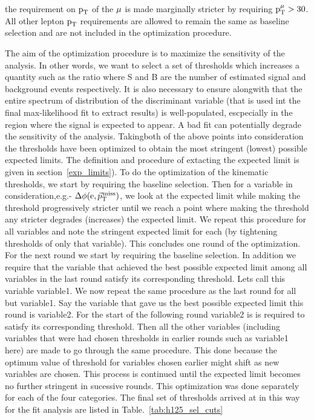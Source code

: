 the requirement on $\text{p}_\text{T}$ of the $\mu$ is made marginally stricter by requiring  $\text{p}_\text{T}^{\mu} > 30$\GeV. All other lepton $\text{p}_\text{T}$ requirements are allowed to remain the same as baseline selection and are not included in the optimization procedure.   

The aim of the optimization procedure is to maximize the sensitivity of the analysis. In other words, we want to select a set of thresholds which increases a quantity such as the  ratio where S and B are the number of estimated signal and background events respectively. It is also necessary to ensure alongwith that the entire spectrum of distribution of the discriminant variable (that is used int the final max-likelihood fit to extract results) is well-populated, escpecially in the region where the signal is expected to appear. A bad fit can potentially degrade the sensitivity of the analysis. Takingboth of the above points into consideration the thresholds have been optimized to obtain the most stringent (lowest) possible expected limits. The definition and procedure of extacting the expected limit is given in section~\ref{exp_limits}). To do the optimization of the kinematic thresholds, we start by requiring the baseline selection. Then for a variable in consideration,e.g.- $\Delta\phi(\text{e}, {\vec p}_{\mathrm{T}}^{\kern1pt\text{miss}})$, we look at the expected limit while making the threshold progressively stricter until we reach a point where making the threshold any stricter degrades (increases) the expected limit. We repeat this procedure for all variables and note the stringent expected limit for each (by tightening thresholds of only that variable). This concludes one round of the optimization. For the next round we start by requiring the baseline selection. In addition we require that the variable that achieved the best possible expected limit among all variables in the last round satisfy its corresponding threshold. Lets call this variable variable1. We now repeat the same procedure as the last round for all but variable1. Say the variable that gave us the best possible expected limit this round is variable2. For the start of the following round variable2 is is required to satisfy its corresponding threshold. Then all the other variables (including variables that were had chosen thresholds in earlier rounds such as variable1 here) are made to go through the same procedure. This done because the optimum value of threshold for variables chosen earlier might shift as new variables are chosen. This process is continued until the expected limit becomes no further stringent in sucessive rounds. This optimization was done separately for each of the four categories. The final set of thresholds arrived at in this way for the \hmue \mcol fit analysis are listed in Table.~\ref{tab:h125_sel_cuts}             


